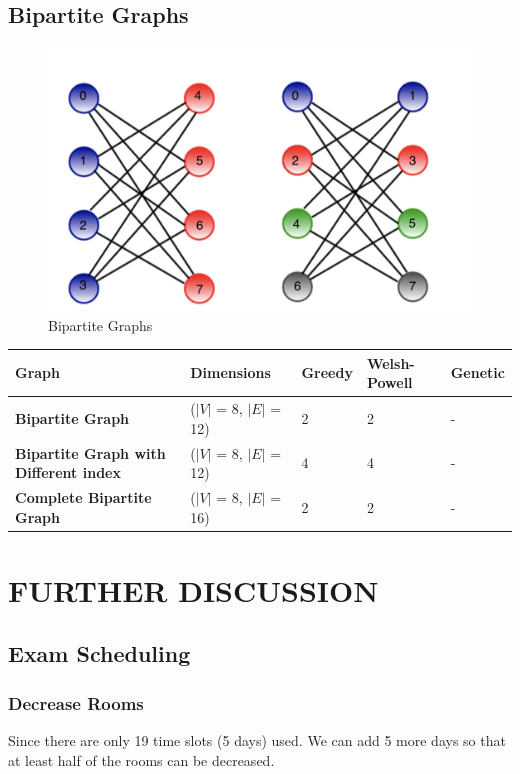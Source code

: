 \documentclass[12]{article}
\begin{document}
\subsection{Bipartite Graphs}
\begin{figure}[H]
\centering
        \includegraphics[scale=.35]{bipartite_coloring.png}
    \caption{Bipartite Graphs}
\end{figure}

\begin{table}[H]
\centering
\begin{tabular}{|l|l|l|l|l|}
\hline
  Graph & Dimensions & \bf{Greedy}  & \bf{Welsh-Powell} &  \bf{Genetic}  \\ \hline
  \bf{Bipartite Graph}  &($|V|$ = 8, $|E|$ = 12)  &2  & 2 &  -  \\ \hline
\bf{Bipartite Graph with Different index}  &($|V|$ = 8, $|E|$ = 12)  & 4  & 4 &  -  \\ \hline
 \bf{Complete Bipartite Graph}  &($|V|$ = 8, $|E|$ = 16) & 2  & 2 &  -  \\ \hline
\end{tabular}
\end{table}

\section{FURTHER DISCUSSION}
\subsection{Exam Scheduling}
\subsubsection{Decrease Rooms}
Since there are only 19 time slots (5 days) used. We can add 5 more days so that at least half of the rooms can be decreased.
\end{document}
